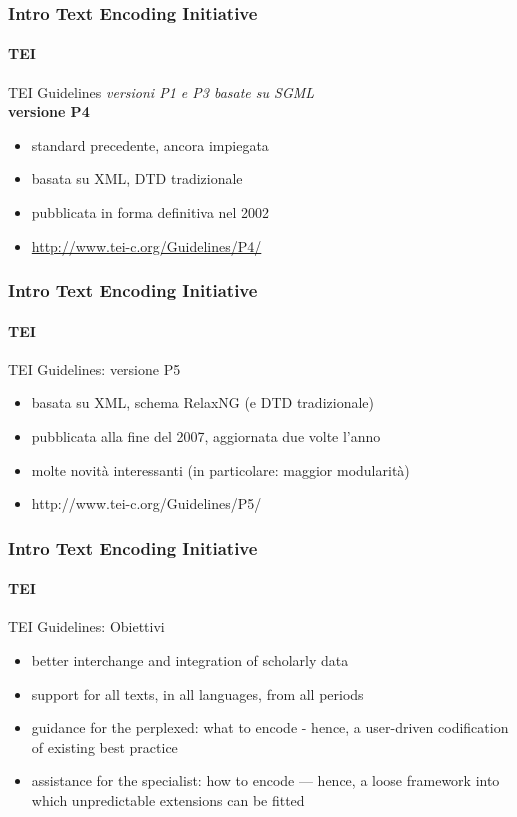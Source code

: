 \begin{frame}
    \frametitle{Intro Text Encoding Initiative}
    \framesubtitle{TEI}
    \addtocounter{nframe}{1}

	\begin{block}{TEI Guidelines}
		\textit{versioni P1 e P3 basate su SGML}
		\\\textbf{versione P4}
		\begin{itemize}
			\item standard precedente, ancora impiegata
			\item basata su XML, DTD tradizionale
			\item pubblicata in forma definitiva nel 2002
			\item \url{http://www.tei-c.org/Guidelines/P4/}
		\end{itemize}
    \end{block}
    
\end{frame}

\begin{frame}
	\frametitle{Intro Text Encoding Initiative}
	\framesubtitle{TEI}
	\addtocounter{nframe}{1}

	\begin{block}{TEI Guidelines: versione P5}
		\begin{itemize}
			\item basata su XML, schema RelaxNG (e DTD tradizionale)
			\item pubblicata alla fine del 2007, aggiornata due volte l’anno
			\item molte novità interessanti (in particolare: maggior modularità)
			\item  http://www.tei-c.org/Guidelines/P5/
		\end{itemize}
	\end{block}

\end{frame}

\begin{frame}
	\frametitle{Intro Text Encoding Initiative}
	\framesubtitle{TEI}
	\addtocounter{nframe}{1}

	\begin{block}{TEI Guidelines: Obiettivi}
		\begin{itemize}
			\item better interchange and integration of scholarly data
			\item support for all texts, in all languages, from all periods
			\item guidance for the perplexed: what to encode - hence, a user-driven codification of existing best practice
			\item assistance for the specialist: how to encode --- hence, a loose framework into which unpredictable extensions can be fitted
		\end{itemize}
	\end{block}

\end{frame}



